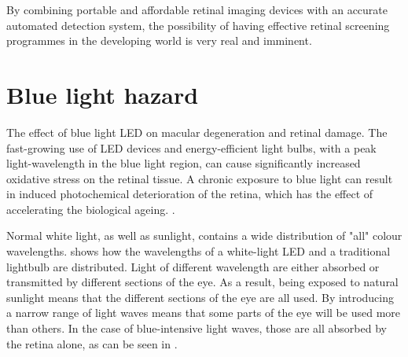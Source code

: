 
By combining portable and affordable retinal imaging devices with an accurate automated
detection system, the possibility of having effective retinal screening programmes in the
developing world is very real and imminent. 


\section{Blue light hazard}

The effect of blue light LED on macular degeneration and retinal damage. The
fast-growing use of LED devices and energy-efficient light bulbs, with a peak light-wavelength
in the blue light region, can cause significantly increased oxidative stress on the retinal
tissue.\cite{shang_wang} A chronic exposure to blue light can result in induced photochemical
deterioration of the retina, which has the effect of accelerating the biological ageing.
\cite{behar_cohen_2011}.


Normal white light, as well as sunlight, contains a wide distribution of "all" colour
wavelengths.  shows how the wavelengths of a white-light LED and a
traditional lightbulb are distributed. Light of different wavelength are either absorbed
or transmitted by different sections of the eye. As a result, being exposed to natural
sunlight means that the different sections of the eye are all used. By introducing a
narrow range of light waves means that some parts of the eye will be used more than
others. In the case of blue-intensive light waves, those are all absorbed by the retina
alone, as can be seen in . 


